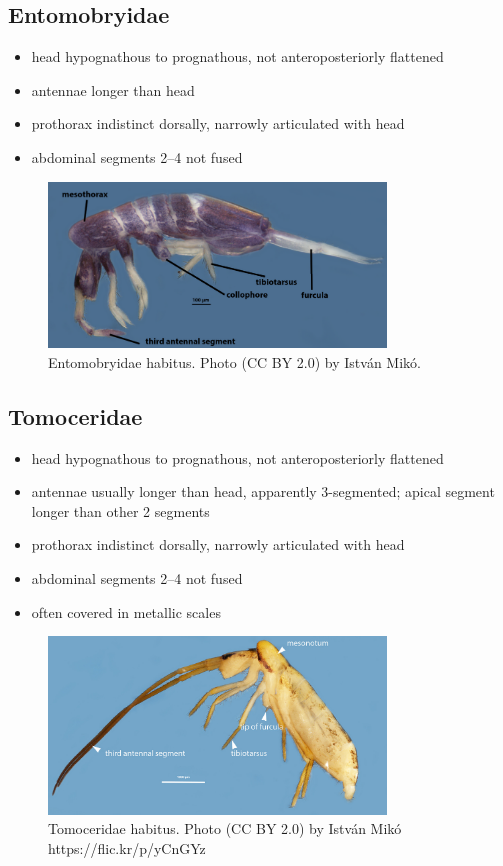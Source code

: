 \documentclass[letterpaper, 11pt]{article}
\begin{document}
\subsection{Entomobryidae}
\begin{itemize}
\item head hypognathous to prognathous, not anteroposteriorly flattened
\item antennae longer than head
\item prothorax indistinct dorsally, narrowly articulated with head
\item abdominal segments 2--4 not fused
\end{itemize}

\begin{figure}[ht!]
  \centering
    \includegraphics[width=0.8\textwidth]{entomobryid}
  \caption{Entomobryidae habitus. Photo (CC BY 2.0) by Istv\'an Mik\'o.}
  \label{fig:entomobry}
\end{figure}

\subsection{Tomoceridae}
\begin{itemize}
\item head hypognathous to prognathous, not anteroposteriorly flattened
\item antennae usually longer than head, apparently 3-segmented; apical segment longer than other 2 segments
\item prothorax indistinct dorsally, narrowly articulated with head
\item abdominal segments 2--4 not fused
\item often covered in metallic scales
\end{itemize}

\begin{figure}[ht!]
  \centering
    \includegraphics[width=0.8\textwidth]{tomo2}
  \caption{Tomoceridae habitus. Photo (CC BY 2.0) by Istv\'an Mik\'o https://flic.kr/p/yCnGYz}
  \label{fig:tomocer}
\end{figure}
\end{document}
